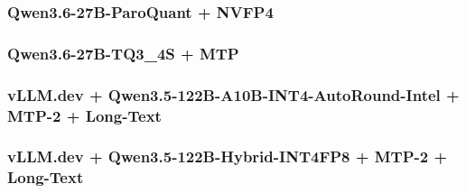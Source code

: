 \documentclass{article}
\begin{document}
\subsubsection{Qwen3.6-27B-ParoQuant + NVFP4}



\subsubsection{Qwen3.6-27B-TQ3\_4S + MTP}



\subsubsection{vLLM.dev + Qwen3.5-122B-A10B-INT4-AutoRound-Intel + MTP-2 + Long-Text}



\subsubsection{vLLM.dev + Qwen3.5-122B-Hybrid-INT4FP8 + MTP-2 + Long-Text}
\end{document}
